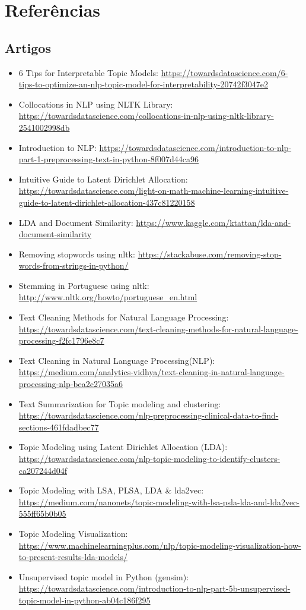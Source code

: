 \section{Referências}

\subsection{Artigos}

\begin{itemize}
    \item 6 Tips for Interpretable Topic Models: \url{https://towardsdatascience.com/6-tips-to-optimize-an-nlp-topic-model-for-interpretability-20742f3047e2}
    \item Collocations in NLP using NLTK Library: \url{https://towardsdatascience.com/collocations-in-nlp-using-nltk-library-2541002998db}
    \item Introduction to NLP: \url{https://towardsdatascience.com/introduction-to-nlp-part-1-preprocessing-text-in-python-8f007d44ca96}
    \item Intuitive Guide to Latent Dirichlet Allocation: \url{https://towardsdatascience.com/light-on-math-machine-learning-intuitive-guide-to-latent-dirichlet-allocation-437c81220158}
    \item LDA and Document Similarity: \url{https://www.kaggle.com/ktattan/lda-and-document-similarity}
    \item Removing stopwords using nltk: \url{https://stackabuse.com/removing-stop-words-from-strings-in-python/}
    \item Stemming in Portuguese using nltk: \url{http://www.nltk.org/howto/portuguese_en.html}
    \item Text Cleaning Methods for Natural Language Processing: \url{https://towardsdatascience.com/text-cleaning-methods-for-natural-language-processing-f2fc1796e8c7}
    \item Text Cleaning in Natural Language Processing(NLP): \url{https://medium.com/analytics-vidhya/text-cleaning-in-natural-language-processing-nlp-bea2c27035a6}
    \item Text Summarization for Topic modeling and clustering: \url{https://towardsdatascience.com/nlp-preprocessing-clinical-data-to-find-sections-461fdadbec77}
    \item Topic Modeling using Latent Dirichlet Allocation (LDA): \url{https://towardsdatascience.com/nlp-topic-modeling-to-identify-clusters-ca207244d04f}
    \item Topic Modeling with LSA, PLSA, LDA \& lda2vec: \url{https://medium.com/nanonets/topic-modeling-with-lsa-psla-lda-and-lda2vec-555ff65b0b05}
    \item Topic Modeling Visualization: \url{https://www.machinelearningplus.com/nlp/topic-modeling-visualization-how-to-present-results-lda-models/}
    \item Unsupervised topic model in Python (gensim): \url{https://towardsdatascience.com/introduction-to-nlp-part-5b-unsupervised-topic-model-in-python-ab04c186f295}
\end{itemize}

